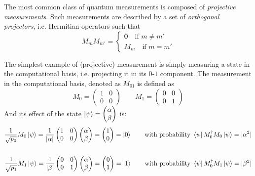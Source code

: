 The most common class of quantum measurements is composed of \textit{projective measurements}. Such measurements are described by a set of \textit{orthogonal projectors}, i.e. Hermitian operators such that \[ M_mM_{m'} = \begin{cases}\mathbf{0}\quad\text{if } m \neq m' \\ M_m\quad\text{if }m = m'\end{cases}\]


The simplest example of (projective) measurement is simply measuring a state in the computational basis, i.e. projecting it in its $0$-$1$ component. The measurement in the computational basis, denoted as $M_{01}$ is defined as \[ M_0 = \begin{pmatrix} 1 & 0 \\ 0 & 0\end{pmatrix} \qquad
M_1 = \begin{pmatrix}0 & 0 \\ 0 & 1\end{pmatrix} \]
And its effect of the state $\ket{\psi} = \begin{pmatrix}\alpha \\ \beta \end{pmatrix}$ is:
\begin{align*}
\frac{1}{\sqrt{p_0}}M_0\ket{\psi} = \frac{1}{|\alpha|}\begin{pmatrix} 1 & 0 \\ 0 & 0\end{pmatrix}
\begin{pmatrix}\alpha \\ \beta \end{pmatrix} = \begin{pmatrix} 1 \\ 0 \end{pmatrix} = \ket{0} 
\qquad \text{with probability } \bra{\psi}M_0^\dagger M_0\ket{\psi} = |\alpha^2| \\
\\
\frac{1}{\sqrt{p_1}}M_1\ket{\psi} = \frac{1}{|\beta|}\begin{pmatrix} 0 & 0 \\ 0 & 1\end{pmatrix}
\begin{pmatrix}\alpha \\ \beta \end{pmatrix} = \begin{pmatrix} 0 \\ 1 \end{pmatrix} = \ket{1} 
\qquad \text{with probability } \bra{\psi}M_0^\dagger M_1\ket{\psi} = |\beta^2|
\end{align*}

